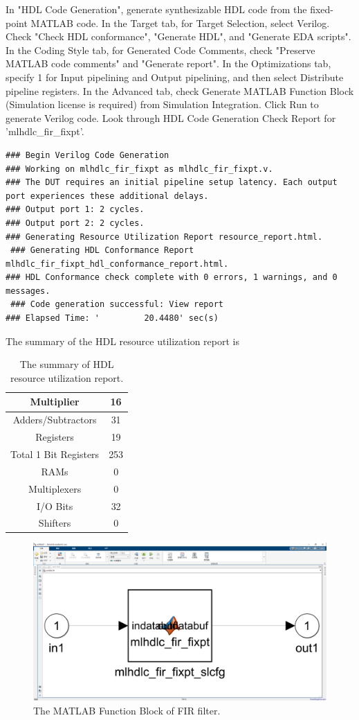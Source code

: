\documentclass[a4paper,12pt,twoside]{article}
\begin{document}
In "HDL Code Generation", generate synthesizable HDL code from the fixed-point MATLAB code. In the Target tab, for Target Selection, select Verilog. Check "Check HDL conformance", "Generate HDL", and "Generate EDA scripts". In the Coding Style tab, for Generated Code Comments, check "Preserve MATLAB code comments" and "Generate report". In the Optimizations tab, specify 1 for Input pipelining and Output pipelining, and then select Distribute pipeline registers. In the Advanced tab, check Generate MATLAB Function Block (Simulation license is required) from Simulation Integration. Click Run to generate Verilog code. Look through HDL Code Generation Check Report for 'mlhdlc\_fir\_fixpt'.
\begin{verbatim}
### Begin Verilog Code Generation
### Working on mlhdlc_fir_fixpt as mlhdlc_fir_fixpt.v.
### The DUT requires an initial pipeline setup latency. Each output port experiences these additional delays.
### Output port 1: 2 cycles.
### Output port 2: 2 cycles.
### Generating Resource Utilization Report resource_report.html.
 ### Generating HDL Conformance Report mlhdlc_fir_fixpt_hdl_conformance_report.html.
### HDL Conformance check complete with 0 errors, 1 warnings, and 0 messages.
 ### Code generation successful: View report
### Elapsed Time: '         20.4480' sec(s)
\end{verbatim}
The summary of the HDL resource utilization report is
\begin{table}[H]
    \centering
    \begin{tabular}{|c|c|}
        \hline
        Multiplier & 16 \\
        \hline
        Adders/Subtractors & 31 \\
        \hline
        Registers & 19 \\
        \hline
        Total 1 Bit Registers & 253 \\
        \hline
        RAMs & 0 \\
        \hline
        Multiplexers & 0 \\
        \hline
        I/O Bits & 32 \\
        \hline
        Shifters & 0 \\
        \hline
    \end{tabular}
    \caption{The summary of HDL resource utilization report.}
\end{table}
\begin{figure}[H]
    \centering
    \includegraphics[width=\textwidth]{images/30.png}
    \caption{The MATLAB Function Block of FIR filter.}
\end{figure}
\end{document}

